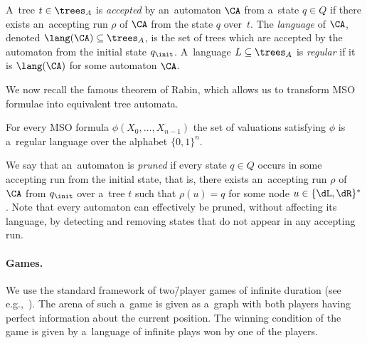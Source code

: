 A~tree $t\in\trees_A$ is \emph{accepted} by an~automaton $\CA$ from a~state $q\in Q$ if there exists an~accepting run $\rho$ of $\CA$ from the state $q$ over~$t$.
The \emph{language} of $\CA$, denoted $\lang(\CA)\subseteq\trees_A$, is the set of trees which are accepted by the automaton from the initial state $q_\init$.
A~language $L\subseteq\trees_A$ is \emph{regular} if it is $\lang(\CA)$ for some automaton $\CA$.

We now recall the famous theorem of Rabin, which allows us to transform MSO formulae into equivalent tree automata.

\begin{thmC}
	For every MSO formula $\phi(X_0,\ldots,X_{n-1})$ the set of valuations satisfying $\phi$ is a~regular language over the alphabet $\{0,1\}^n$.
\end{thmC}
\noindent %
We say that an~automaton is \emph{pruned} if every state $q\in Q$ occurs in some accepting run from the initial state, that is,
there exists an~accepting run $\rho$ of $\CA$ from $q_{\init}$ over a~tree $t$ such that $\rho(u)=q$ for some node $u\in\{\dL,\dR\}^\ast$.
Note that every automaton can effectively be pruned, without affecting its language, by detecting and removing states that do not appear in any accepting run.


\paragraph*{Games.}
We use the standard framework of two\=/player games of infinite duration (see e.g.,~\cite{buchi_synthesis,fijalkow_games}).
The arena of such a~game is given as a~graph with both players having perfect information about the current position.
The winning condition of the game is given by a~language of infinite plays won by one of the players.


